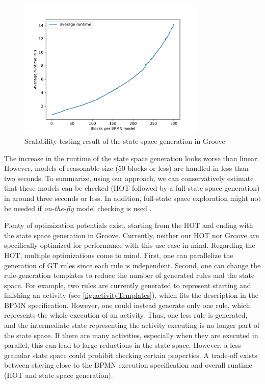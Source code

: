 \documentclass{lmcs} %
\begin{document}
\begin{figure}[ht]
    \centering
    \includegraphics[width=0.8\textwidth]{images/StateSpaceGeneration_scalability.pdf}
    \caption{Scalability testing result of the state space generation in Groove}
    \label{fig:stateSpaceScalability}
\end{figure}

The increase in the runtime of the state space generation looks worse than linear.
However, models of reasonable size (50 blocks or less) are handled in less than two seconds.
To summarize, using our approach, we can conservatively estimate that these models can be checked (HOT followed by a full state space generation) in around three seconds or less.
In addition, full-state space exploration might not be needed if \textit{on-the-fly} model checking is used \cite{clarkeHandbookModelChecking2018}.

Plenty of optimization potentials exist, starting from the HOT and ending with the state space generation in Groove.
Currently, neither our HOT nor Groove are specifically optimized for performance with this use case in mind.
Regarding the HOT, multiple optimizations come to mind.
First, one can parallelize the generation of GT rules since each rule is independent.
Second, one can change the rule-generation templates to reduce the number of generated rules and the state space.
For example, two rules are currently generated to represent starting and finishing an activity (see \autoref{fig:activityTemplates}), which fits the description in the BPMN specification.
However, one could instead generate only one rule, which represents the whole execution of an activity.
Thus, one less rule is generated, and the intermediate state representing the activity executing is no longer part of the state space.
If there are many activities, especially when they are executed in parallel, this can lead to large reductions in the state space.
However, a less granular state space could prohibit checking certain properties.
A trade-off exists between staying close to the BPMN execution specification and overall runtime (HOT and state space generation).
\end{document}
